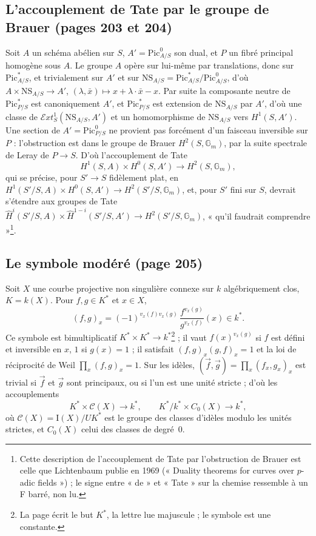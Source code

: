 \documentclass[11pt,a4paper]{article}
\begin{document}
\subsection*{L'accouplement de Tate par le groupe de Brauer (pages 203 et 204)}

Soit $A$ un schéma abélien sur $S$, $A' = \mathrm{Pic}^0_{A/S}$ son dual, et $P$ un
fibré principal homogène sous $A$. Le groupe $A$ opère sur lui-même par
translations, donc sur $\mathrm{Pic}^{*}_{A/S}$, et trivialement sur $A'$ et sur
$\mathrm{NS}_{A/S} = \mathrm{Pic}^{*}_{A/S}/\mathrm{Pic}^0_{A/S}$, d'où
$A \times \mathrm{NS}_{A/S} \to A'$, $(\lambda, \bar x) \mapsto x + \lambda\cdot\bar x
- x$. Par suite la composante neutre de $\mathrm{Pic}^{*}_{P/S}$ est canoniquement
$A'$, et $\mathrm{Pic}^{*}_{P/S}$ est extension de $\mathrm{NS}_{A/S}$ par $A'$, d'où
une classe de $\mathcal{E}xt^1_S(\mathrm{NS}_{A/S}, A')$ et un homomorphisme de
$\mathrm{NS}_{A/S}$ vers $H^1(S, A')$. Une section de $A' = \mathrm{Pic}^0_{P/S}$ ne
provient pas forcément d'un faisceau inversible sur $P$ : l'obstruction est dans le
groupe de Brauer $H^2(S, \mathbb{G}_m)$, par la suite spectrale de Leray de
$P \to S$. D'où l'accouplement de Tate
\[
H^1(S, A) \times H^0(S, A') \longrightarrow H^2(S, \mathbb{G}_m),
\]
qui se précise, pour $S' \to S$ fidèlement plat, en $H^1(S'/S, A) \times H^0(S, A')
\to H^2(S'/S, \mathbb{G}_m)$, et, pour $S'$ fini sur $S$, devrait s'étendre aux
groupes de Tate $\hat H^i(S'/S, A) \times \hat H^{1-i}(S'/S, A') \to H^2(S'/S,
\mathbb{G}_m)$, « qu'il faudrait comprendre »\footnote{Cette description de
l'accouplement de Tate par l'obstruction de Brauer est celle que Lichtenbaum
publie en 1969 (« Duality theorems for curves over $p$-adic fields ») ; le
signe entre « de » et « Tate » sur la chemise ressemble à un F barré, non lu.}.

\subsection*{Le symbole modéré (page 205)}

Soit $X$ une courbe projective non singulière connexe sur $k$ algébriquement
clos, $K = k(X)$. Pour $f, g \in K^{*}$ et $x \in X$,
\[
(f, g)_x = (-1)^{v_x(f)v_x(g)}\,\frac{f^{v_x(g)}}{g^{v_x(f)}}(x) \in k^{*}.
\]
Ce symbole est bimultiplicatif $K^{*} \times K^{*} \to k^{*}$\footnote{La page écrit
le but $K^{*}$, la lettre lue majuscule ; le symbole est une constante.} ; il vaut
$f(x)^{v_x(g)}$ si $f$ est défini et inversible en $x$, $1$ si $g(x) = 1$ ; il
satisfait $(f, g)_x (g, f)_x = 1$ et la loi de réciprocité de Weil $\prod_x (f,g)_x
= 1$. Sur les idèles, $(\vec f, \vec g) = \prod_x (f_x, g_x)_x$ est trivial si
$\vec f$ et $\vec g$ sont principaux, ou si l'un est une unité stricte ; d'où les
accouplements
\[
K^{*} \times \mathcal{C}(X) \to k^{*},
\qquad
K^{*}/k^{*} \times C_0(X) \to k^{*},
\]
où $\mathcal{C}(X) = \mathrm{I}(X)/UK^{*}$ est le groupe des classes d'idèles modulo
les unités strictes, et $C_0(X)$ celui des classes de degré~$0$.
\end{document}
